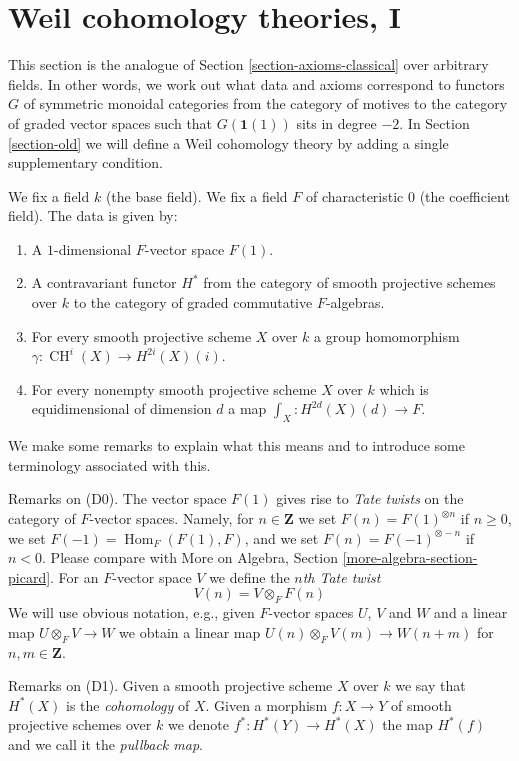 \documentclass{stacks-project}
\theoremstyle{plain}
\theoremstyle{definition}
\theoremstyle{remark}
\numberwithin{equation}{subsection}
\def\Hom{\mathop{\mathrm{Hom}}\nolimits}
\def\CH{\mathop{\mathrm{CH}}\nolimits}
\begin{document}
\section{Weil cohomology theories, I}
\label{section-axioms}

\noindent
This section is the analogue of Section \ref{section-axioms-classical}
over arbitrary fields. In other words, we work out what data and
axioms correspond to functors $G$ of symmetric monoidal categories from
the category of motives to the category of graded vector spaces such that
$G(\mathbf{1}(1))$ sits in degree $-2$. In Section \ref{section-old}
we will define a Weil cohomology theory by adding a single supplementary
condition.

\medskip\noindent
We fix a field $k$ (the base field).
We fix a field $F$ of characteristic $0$ (the coefficient field).
The data is given by:
\begin{enumerate}
\item[(D0)] A $1$-dimensional $F$-vector space $F(1)$.
\item[(D1)] A contravariant functor $H^*$ from the category
of smooth projective schemes over $k$ to the category of
graded commutative $F$-algebras.
\item[(D2)] For every smooth projective scheme $X$ over $k$
a group homomorphism $\gamma : \CH^i(X) \to H^{2i}(X)(i)$.
\item[(D3)] For every nonempty smooth projective scheme $X$ over $k$
which is equidimensional of dimension $d$ a map
$\int_X : H^{2d}(X)(d) \to F$.
\end{enumerate}
We make some remarks to explain what this means and to introduce
some terminology associated with this.

\medskip\noindent
Remarks on (D0).
The vector space $F(1)$ gives rise to {\it Tate twists} on the category of
$F$-vector spaces. Namely, for $n \in \mathbf{Z}$ we set
$F(n) = F(1)^{\otimes n}$ if $n \geq 0$, we set $F(-1) = \Hom_F(F(1), F)$,
and we set $F(n) = F(-1)^{\otimes - n}$ if $n < 0$. Please compare
with More on Algebra, Section \ref{more-algebra-section-picard}.
For an $F$-vector space $V$ we define the {\it $n$th Tate twist}
$$
V(n) = V \otimes_F F(n)
$$
We will use obvious notation, e.g., given $F$-vector spaces $U$, $V$
and $W$ and a linear map $U \otimes_F V \to W$ we obtain a linear
map $U(n) \otimes_F V(m) \to W(n + m)$ for $n, m \in \mathbf{Z}$.

\medskip\noindent
Remarks on (D1).
Given a smooth projective scheme $X$ over $k$ we say that $H^*(X)$
is the {\it cohomology} of $X$. Given a morphism $f : X \to Y$
of smooth projective schemes over $k$ we denote $f^* : H^*(Y) \to H^*(X)$
the map $H^*(f)$ and we call it the {\it pullback map}.
\end{document}
